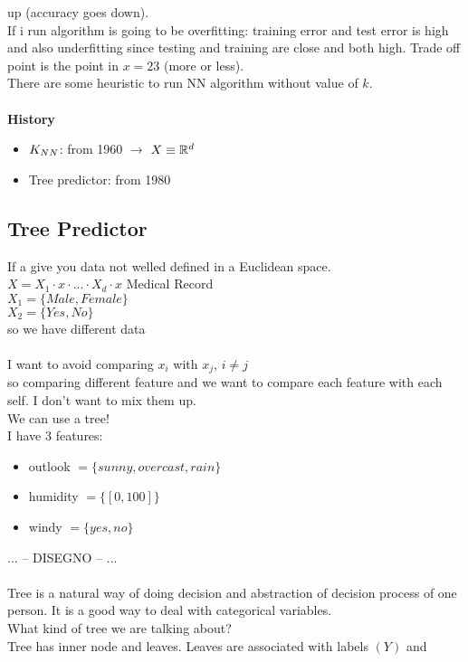 \documentclass[../main.tex]{subfiles}
\begin{document}
up (accuracy goes down).\\
If i run algorithm is going to be overfitting: training error and test error is high and also underfitting since testing and training are close and both high.
Trade off point is the point in $x = 23$ (more or less).\\
There are some heuristic to run NN algorithm without value of $k$.
\\\\
\textbf{History}
\begin{itemize}
\item $K_{NN}$: from 1960 $\rightarrow$ $X \equiv \mathbb{R}^d$
\item Tree predictor: from 1980
\\
\end{itemize}

\subsection{Tree Predictor}
If a give you data not welled defined in a Euclidean space.
\\
$X = X_1 \cdot x \cdot ... \cdot X_d \cdot x$ \qquad Medical Record
\\
$X_1 = \{Male, Female\}$\\
$X_2 = \{Yes, No\}$
\\
so we have different data
\\\\
I want to avoid comparing $x_i$ with $x_j$,  $i\neq j $\\
so comparing different feature and we want to compare each feature with
each self. I don’t want to mix them up.\\
We can use a tree!
\\
I have 3 features:
\begin{itemize}
\item outlook  $= \{sunny, overcast, rain\}$
\item humidity $= \{[0,100]\}$
\item windy $ = \{yes,no\}$
\end{itemize}
... -- DISEGNO -- ...\\\\
Tree is a natural way of doing decision and abstraction of decision process of
one person. It is a good way to deal with categorical variables.\\
What kind of tree we are talking about?\\
Tree has inner node and leaves. Leaves are associated with labels $(Y)$ and
\end{document}

